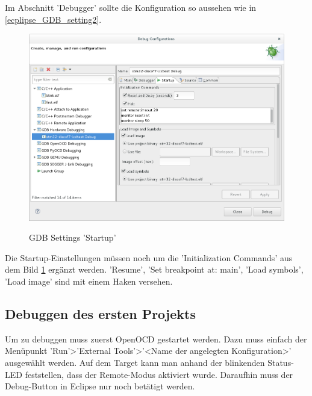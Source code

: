\documentclass[12pt,a4paper]{article}
\begin{document}
Im Abschnitt 'Debugger' sollte die Konfiguration so aussehen wie in \ref{ecplipse_GDB_setting2}.
\begin{figure}[h]
\begin{center}
\includegraphics[width=12cm]{grafiken/debugger/GDBsetting3.png}
\label{ecplipse_GDB_setting3}
\caption{GDB Settings 'Startup'}
\end{center}
\end{figure}
Die Startup-Einstellungen müssen noch um die 'Initialization Commands' aus dem Bild \ref{ecplipse_GDB_setting3} ergänzt werden.
'Resume', 'Set breakpoint at: main', 'Load symbols', 'Load image' sind mit einem Haken versehen. 
\FloatBarrier
\subsection{Debuggen des ersten Projekts}
Um zu debuggen muss zuerst OpenOCD gestartet werden. Dazu muss einfach der Menüpunkt 'Run'>'External Tools'>'<Name der angelegten Konfiguration>' ausgewählt werden. Auf dem Target kann man anhand der blinkenden Status-LED feststellen, dass der Remote-Modus aktiviert wurde. Daraufhin muss der Debug-Button in Eclipse nur noch betätigt werden.
\end{document}

